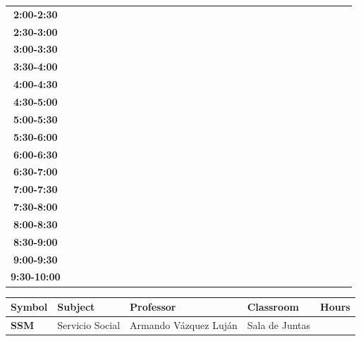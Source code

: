 \documentclass{article}
\begin{document}
\begin{table}[ht]
\begin{tabular}{|c|c|c|c|c|c|c|c|c|c|c|c|c|c|c|c|c|c|c|c|c|c|c|c|c|c|c|c|c|c|}
 \cline{1-8} 
\textbf{2:00-2:30} &   &   &   &   &   &   &   \\
 \cline{1-8} 
\textbf{2:30-3:00} &   &   &   &   &   &   &   \\
 \cline{1-8} 
\textbf{3:00-3:30} &   &   &   &   &   &   &   \\
 \cline{1-8} 
\textbf{3:30-4:00} &   &   &   &   &   &   &   \\
 \cline{1-8} 
\textbf{4:00-4:30} &   &   &   &   &   &   &   \\
 \cline{1-8} 
\textbf{4:30-5:00} &   &   &   &   &   &   &   \\
 \cline{1-8} 
\textbf{5:00-5:30} &   &   &   &   &   &   &   \\
 \cline{1-8} 
\textbf{5:30-6:00} &   &   &   &   &   &   &   \\
 \cline{1-8} 
\textbf{6:00-6:30} &   &   &   &   &   &   &   \\
 \cline{1-8} 
\textbf{6:30-7:00} &   &   &   &   &   &   &   \\
 \cline{1-8} 
\textbf{7:00-7:30} &   &   &   &   &   &   &   \\
 \cline{1-8} 
\textbf{7:30-8:00} &   &   &   &   &   &   &   \\
 \cline{1-8} 
\textbf{8:00-8:30} &   &   &   &   &   &   &   \\
 \cline{1-8} 
\textbf{8:30-9:00} &   &   &   &   &   &   &   \\
 \cline{1-8} 
\textbf{9:00-9:30} &   &   &   &   &   &   &   \\
 \cline{1-8} 
\textbf{9:30-10:00} &   &   &   &   &   &   &   \\
 \cline{1-8} 
\end{tabular}\end{table}

                        
        \begin{tabular}{|>{\centering\arraybackslash}m{2cm}|>{\centering\arraybackslash}m{4cm}|>{\centering\arraybackslash}m{4cm}|>{\centering\arraybackslash}m{3.5cm}|>{\centering\arraybackslash}m{3.5cm}|}
        \hline
        \textbf{Symbol} & \textbf{Subject} & \textbf{Professor} & \textbf{Classroom} & \textbf{Hours} \\
        \hline
        
            \hline
            \cellcolor[rgb]{0.7490196078431373,0.34901960784313724,0.25882352941176473} \textbf{SSM} & Servicio Social & Armando V\'azquez Luj\'an & Sala de Juntas & 5.0  \\
            \hline
            \end{tabular}
                    
\end{document}
